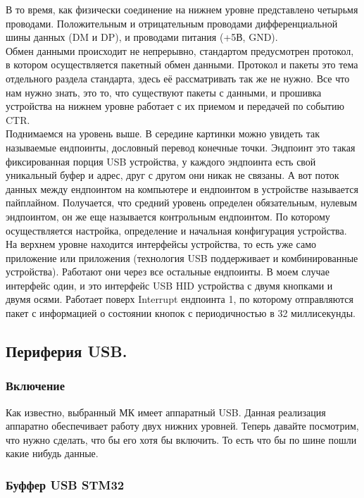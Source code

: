 \documentclass[12pt,a4paper]{article}
\begin{document}
    В то время, как физически соединение на нижнем уровне представлено
    четырьмя проводами. Положительным и отрицательным проводами дифференциальной
    шины данных (DM и DP), и проводами питания (+5В, GND). \\
    Обмен данными происходит не непрерывно, стандартом предусмотрен протокол, в
    котором осуществляется пакетный обмен данными. Протокол и пакеты это
    тема отдельного раздела стандарта, здесь её рассматривать так же не нужно.
    Все что нам нужно знать, это то, что существуют пакеты с данными, и
    прошивка устройства на нижнем уровне работает с их приемом и передачей по
    событию CTR.\\
    Поднимаемся на уровень выше. В середине картинки можно увидеть так
    называемые ендпоинты, дословный перевод конечные точки. Эндпоинт это
    такая фиксированная порция USB устройства, у каждого эндпоинта есть свой
    уникальный буфер и адрес, друг с другом они никак не связаны. А вот поток
    данных между ендпоинтом на компьютере и ендпоинтом в устройстве называется
    пайплайном. Получается, что средний уровень определен обязательным, нулевым
    эндпоинтом, он же еще называется контрольным ендпоинтом. По которому
    осуществляется настройка, определение и начальная конфигурация устройства.\\
    На верхнем уровне находится интерфейсы устройства, то есть уже само
    приложение или приложения (технология USB поддерживает и комбинированные
    устройства). Работают они через все остальные ендпоинты. В моем случае интерфейс
    один, и это интерфейс USB HID
    устройства с двумя кнопками и двумя осями. Работает поверх Interrupt
    ендпоинта 1, по которому отправляются пакет с информацией о состоянии кнопок
    с периодичностью в 32 миллисекунды.

\subsection{Периферия USB.}
\subsubsection{Включение}
    Как известно, выбранный МК имеет аппаратный USB. Данная реализация аппаратно
    обеспечивает работу двух нижних уровней. Теперь давайте посмотрим,
    что нужно сделать, что бы его хотя бы включить. То есть что бы по шине пошли
    какие нибудь данные.
\subsubsection{Буффер USB STM32}
\end{document}
